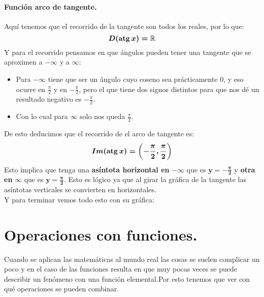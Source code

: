\documentclass[a4paper,11pt,answers]{exam}
\begin{document}
\paragraph{Función arco de tangente.}
Aquí tenemos que el recorrido de la tangente son todos los reales, por lo que:
\[\boldsymbol{D(\mathrm{atg\,} x) = \mathbb{R}}\]
Y para el recorrido pensamos en que ángulos pueden tener una tangente que se aproximen a $-\infty$ y a $\infty$:
\begin{itemize}
	\item Para $-\infty$ tiene que ser un ángulo cuyo coseno sea prácticamente 0, y eso ocurre en $\frac{\pi}{2}$ y en $-\frac{\pi}{2}$, pero el que tiene dos signos distintos para que nos dé un resultado negativo es $-\frac{\pi}{2}$.
	\item Con lo cual para $\infty$ solo nos queda $\frac{\pi}{2}$.
\end{itemize}
De esto deducimos que el recorrido de el arco de tangente es:
\[\boldsymbol{Im(\mathrm{atg\,} x)= \left(-\frac{\pi}{2}, \frac{\pi}{2}\right)}\]
Esto implica que tenga una \textbf{asíntota horizontal en} $\boldsymbol{-\infty}$ que es $\boldsymbol{y = -\frac{\pi}{2}}$ y \textbf{otra en} $\boldsymbol{\infty}$ que es $\boldsymbol{y = \frac{\pi}{2}}$. Esto es lógico ya que al girar la gráfica de la tangente las asíntotas verticales se convierten en horizontales.\\
Y para terminar vemos todo esto con su gráfica:
\begin{center}
\end{center}
\section{Operaciones con funciones.}
Cuando se aplican las matemáticas al mundo real las cosas se suelen complicar un poco y en el caso de las funciones resulta en que muy pocas veces se puede describir un fenómeno con una función elemental.Por esto tenemos que ver con qué operaciones se pueden combinar.\\
\end{document}
